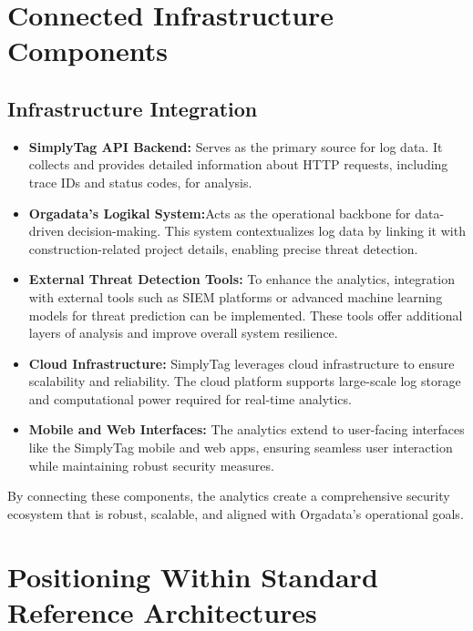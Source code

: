%
%

\chapter{Connected Infrastructure Components}

\section{Infrastructure Integration}

\begin{itemize}
	\item \textbf{SimplyTag API Backend:} Serves as the primary source for log data. It collects and provides detailed information about HTTP requests, including trace IDs and status codes, for analysis.
	\item \textbf{Orgadata’s Logikal System:}Acts as the operational backbone for data-driven decision-making. This system contextualizes log data by linking it with construction-related project details, enabling precise threat detection.
	\item \textbf{External Threat Detection Tools:} To enhance the analytics, integration with external tools such as SIEM platforms or advanced machine learning models for threat prediction can be implemented. These tools offer additional layers of analysis and improve overall system resilience.
	\item \textbf{Cloud Infrastructure:} SimplyTag leverages cloud infrastructure to ensure scalability and reliability. The cloud platform supports large-scale log storage and computational power required for real-time analytics.
	\item \textbf{Mobile and Web Interfaces:} The analytics extend to user-facing interfaces like the SimplyTag mobile and web apps, ensuring seamless user interaction while maintaining robust security measures.
\end{itemize}

By connecting these components, the analytics create a comprehensive security ecosystem that is robust, scalable, and aligned with Orgadata’s operational goals.

\newpage
\chapter{Positioning Within Standard Reference Architectures}

